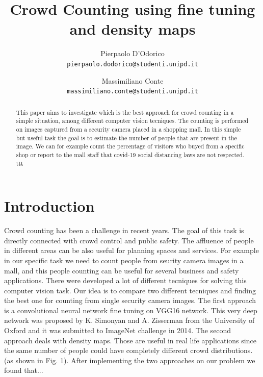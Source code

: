 \documentclass[10pt,twocolumn,letterpaper]{article}
\begin{document}
\title{Crowd Counting using fine tuning and density maps}

\author{Pierpaolo D'Odorico\\
{\tt\small pierpaolo.dodorico@studenti.unipd.it}
\and
Massimiliano Conte\\
{\tt\small massimiliano.conte@studenti.unipd.it}
}


\maketitle
\begin{abstract}

This paper aims to investigate which is the best approach for crowd counting in a simple situation, among different computer vision tecniques. The counting is performed on images captured from a security camera placed in a shopping mall. In this simple but useful task the goal is to estimate the number of people that are present in the image. We can for example count the percentage of visitors who buyed from a specific shop or report to the mall staff that covid-19 social distancing laws are not respected. ttt

\end{abstract}

\section{Introduction}

Crowd counting has been a challenge in recent years. The goal of this task is directly connected with crowd control and public safety. The affluence of people in different areas can be also useful for planning spaces and services. For example in our specific task we need to count people from seurity camera images in a mall, and this people counting can be useful for several business and safety applications. 
There were developed a lot of different tecniques for solving this computer vision task. Our idea is to compare two different tecniques and finding the best one for counting from single security camera images. The first approach is a convolutional neural network fine tuning on VGG16 network.  This very deep network was proposed by K. Simonyan and A. Zisserman from the University of Oxford and it was submitted to ImageNet challenge in 2014. The second approach deals with density maps. Those are useful in real life applications since the same number of people could have completely different crowd distributions. (as shown in Fig. 1). After implementing the two approaches on our problem we found that...
\end{document}
